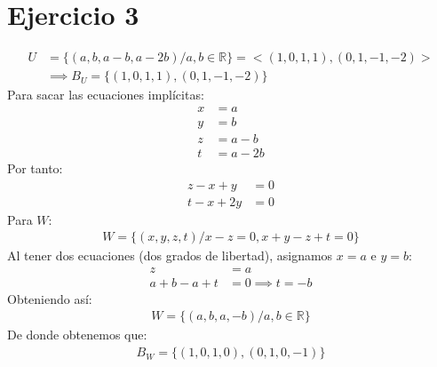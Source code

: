 \documentclass{article}
\begin{document}
\section{Ejercicio 3}
\begin{equation}
    \begin{split}
        U &= \{ (a,b,a-b,a-2b) / a,b \in \mathbb{R} \} = <(1,0,1,1),(0,1,-1,-2)>\\
        & \implies B_{U} = \{ (1,0,1,1),(0,1,-1,-2) \}
    \end{split}
\end{equation}
Para sacar las ecuaciones implícitas:
\begin{equation}
    \begin{split}
        x &= a\\ y &= b \\ z &= a-b \\ t &= a -2b
    \end{split}
\end{equation}
Por tanto:
\begin{equation}
    \begin{split}
        z - x + y &= 0\\ t - x +2y &= 0
    \end{split}
\end{equation}
Para $W$:
\begin{equation}
    \begin{split}
        W = \{ (x,y,z,t) / x-z = 0, x+y-z+t = 0 \}
    \end{split}
\end{equation}
Al tener dos ecuaciones (dos grados de libertad), asignamos $x = a$ e $y = b$:
\begin{equation}
    \begin{split}
        z &= a\\ a + b -a + t &= 0 \implies t = -b
    \end{split}
\end{equation}
Obteniendo así:
\begin{equation}
    \begin{split}
        W = \{ (a,b,a,-b) / a,b \in \mathbb{R} \}
    \end{split}
\end{equation}
De donde obtenemos que:
\begin{equation}
    \begin{split}
        B_{W} = \{ (1,0,1,0), (0,1,0,-1) \}
    \end{split}
\end{equation}
\end{document}
